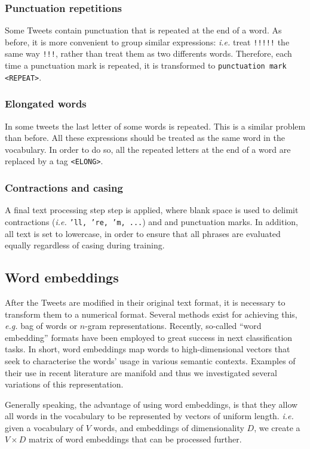 \subsubsection{Punctuation repetitions}
Some Tweets contain punctuation that is repeated at the end of a word. As before, it is more convenient to group similar expressions: \emph{i.e.} treat \texttt{!!!!!} the same way \texttt{!!!}, rather than treat them as two differents words. Therefore, each time a punctuation mark is repeated, it is transformed to \texttt{punctuation mark <REPEAT>}. 

\subsubsection{Elongated words}
In some tweets the last letter of some words is repeated. This is a similar problem than before. All these expressions should be treated as the same word in the vocabulary. In order to do so, all the repeated letters at the end of a word are replaced by a tag \texttt{<ELONG>}.

\subsubsection{Contractions and casing}
A final text processing step step is applied, where blank space is used to delimit contractions (\emph{i.e.} \texttt{'ll, 're, 'm, ...}) and and punctuation marks. In addition, all text is set to lowercase, in order to ensure that all phrases are evaluated equally regardless of casing during training.

\subsection{Word embeddings}
After the Tweets are modified in their original text format, it is necessary to transform them to a numerical format. Several methods exist for achieving this, \emph{e.g.} bag of words or $n$-gram representations. Recently, so-called ``word embedding'' formats \cite{mikolov2013efficient} have been employed to great success in next classification tasks. In short, word embeddings map words to high-dimensional vectors that seek to characterise the words' usage in various semantic contexts. Examples of their use in recent literature are manifold \cite{mikolov2013efficient, mikolov2013distributed, collobert2011natural} and thus we investigated several variations of this representation.

Generally speaking, the advantage of using word embeddings, is that they allow all words in the vocabulary to be represented by vectors of uniform length. \emph{i.e.} given a vocabulary of $V$ words, and embeddings of dimensionality $D$, we create a $V \times D$ matrix of word embeddings that can be processed further.

